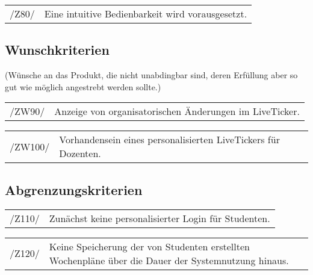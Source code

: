 \begin{tabular}{p{1.5cm}p{14.5cm}}	
	 /Z80/& Eine intuitive Bedienbarkeit wird vorausgesetzt. \\[0.25cm]
\end{tabular}


\subsection{Wunschkriterien }
(Wünsche an das Produkt, die nicht unabdingbar sind, deren Erfüllung aber so gut wie möglich angestrebt werden sollte.) \\

\begin{tabular}{p{1.5cm}p{14.5cm}}	
	 /ZW90/& Anzeige von organisatorischen Änderungen im LiveTicker. \\[0.25cm]
\end{tabular}

\begin{tabular}{p{1.5cm}p{14.5cm}}	
	 /ZW100/& Vorhandensein eines personalisierten LiveTickers für Dozenten. \\[0.25cm]
\end{tabular}


\subsection{Abgrenzungskriterien}

\begin{tabular}{p{1.5cm}p{14.5cm}}	
	 /Z110/& Zunächst keine personalisierter Login für Studenten. \\[0.25cm]
\end{tabular}

\begin{tabular}{p{1.5cm}p{14.5cm}}	
	 /Z120/& Keine Speicherung der von Studenten erstellten Wochenpläne über die Dauer der 
  Systemnutzung hinaus. \\[0.25cm]
\end{tabular}